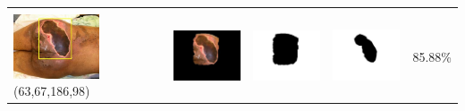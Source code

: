 \begin{table}[H]
\begin{tabular}{|m{1.0in}|m{1.0in}|m{1.0in}|m{1.0in}|m{0.6in}|}
		&  &  & \\
		\includegraphics[width=1.0in]{gambar/hasil_segmentasi/luka_hitam/image_41_rect.jpg} {\centering\fontsize{10}{10}\selectfont(63,67,186,98)}&
		\includegraphics[width=1.0in]{gambar/hasil_segmentasi/luka_hitam/result_41.jpg}&
		\includegraphics[width=1.0in]{gambar/hasil_segmentasi/luka_hitam/mask_r_41.jpg}&
		\includegraphics[width=1.0in]{gambar/hasil_segmentasi/luka_hitam/41_r.jpg}&
		85.88\% \\
		\hline 

	\end{tabular}
\end{table}

